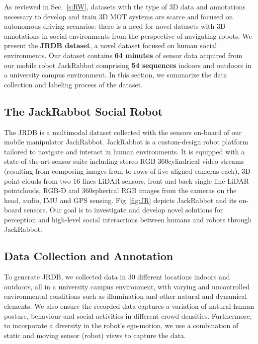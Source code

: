 \documentclass[letterpaper, 10 pt, conference]{ieeeconf}
\newcommand{\jrdb}{JRDB\xspace}
\newcommand{\jackrabbot}{JackRabbot\xspace}
\begin{document}
As reviewed in Sec.~\ref{s:RW}, datasets with the type of 3D data and annotations necessary to develop and train 3D MOT systems are scarce and focused on autonomous driving scenarios: there is a need for novel datasets with 3D annotations in social environments from the perspective of navigating robots. We present the \textbf{\jrdb dataset}, a novel dataset focused on human social environments. Our dataset contains {\bf 64 minutes} of sensor data acquired from our mobile robot \jackrabbot comprising {\bf 54 sequences} indoors and outdoors in a university campus environment. In this section, we summarize the data collection and labeling process of the dataset. 



\subsection{The \jackrabbot Social Robot}





The \jrdb is a multimodal dataset collected with the sensors on-board of our mobile manipulator \jackrabbot. \jackrabbot is a custom-design robot platform tailored to navigate and interact in human environments. It is equipped with a state-of-the-art sensor suite including stereo RGB 360\degree cylindrical video streams (resulting from composing images from to rows of five aligned cameras each), 3D point clouds from two 16 lines LiDAR sensors, front and back single line LiDAR pointclouds, RGB-D and 360\degree spherical RGB images from the cameras on the head, audio, IMU and GPS sensing. Fig~\ref{fig:JR} depicts \jackrabbot and its on-board sensors. Our goal is to investigate and develop novel solutions for perception and high-level social interactions between humans and robots through \jackrabbot.

\subsection{Data Collection and Annotation}

To generate \jrdb, we collected data in 30 different locations indoors and outdoors, all in a university campus environment, with varying and uncontrolled environmental conditions such as illumination and other natural and dynamical elements. We also ensure the recorded data captures a variation of natural human posture, behaviour and social activities in different crowd densities. Furthermore, to incorporate a diversity in the robot's ego-motion, we use a combination of static and moving sensor (robot) views to capture the data.
\end{document}
